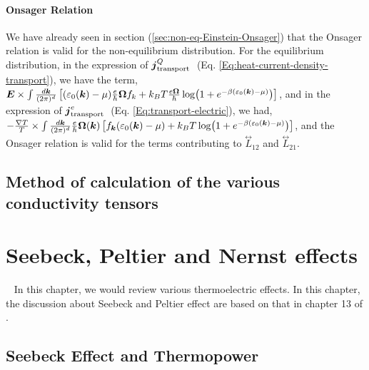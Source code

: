 \documentclass{report}
\renewcommand\vec[1]{\ensuremath\boldsymbol{#1}} %
\begin{document}
\subsubsection{Onsager Relation}
We have already seen in section (\ref{sec:non-eq-Einstein-Onsager}) that the Onsager relation is valid for the non-equilibrium distribution. For the equilibrium distribution, in the expression of $\vec{j}_{\text {transport }}^{Q}$ (Eq. \eqref{Eq:heat-current-density-transport}), we have the term, $\vec{E} \times \int \frac{d\vec{k}}{(2\pi)^d} \left[(\varepsilon_0(\vec{k})-\mu) \frac{e}{\hbar} \vec{\Omega} f_{k} + k_{B} T \frac{e \vec{\Omega}}{\hbar} \log(1 + e^{-\beta(\varepsilon_0(\vec{k}) - \mu)})\right]$, and in the expression of $\vec{j}_{\text {transport }}^{e}$ (Eq. \eqref{Eq:transport-electric}), we had, $-\frac{\nabla T}{T}  \times \int  \frac{d\vec{k}}{(2\pi)^d} \frac{e}{\hbar} \vec{\Omega}(\vec{k}) \left[f_{\vec{k}} (\varepsilon_0(\vec{k}) - \mu) + k_B T \log(1 + e^{-\beta(\varepsilon_0(\vec{k}) - \mu)})\right]$, and the Onsager relation is valid for the terms contributing to $\stackrel{\leftrightarrow}{L}_{12}$ and $\stackrel{\leftrightarrow}{L}_{21}$.

\section{Method of calculation of the various conductivity tensors}
\chapter{Seebeck, Peltier and Nernst effects}~\label{chap:Seebeck-Peltier-Nernst}
In this chapter, we would review various thermoelectric effects. In this chapter, the discussion about Seebeck and Peltier effect are based on that in chapter 13 of \cite{book:AshcroftMermin76}.
\section{Seebeck Effect and Thermopower}
\end{document}
